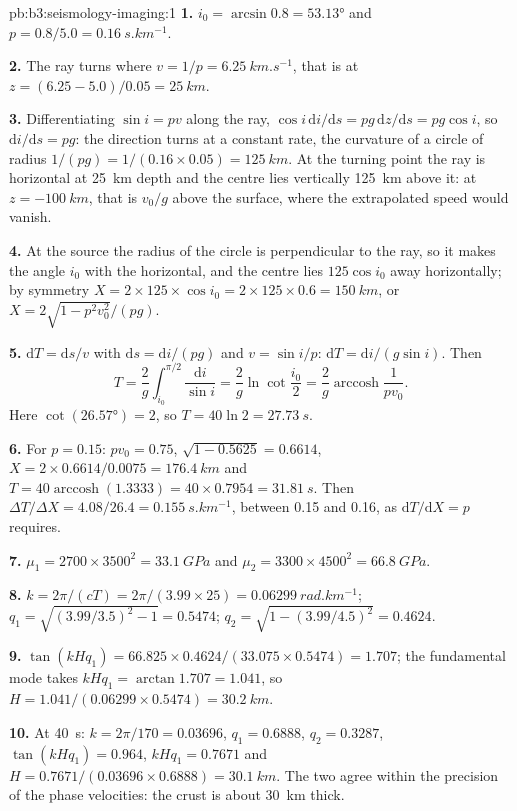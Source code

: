 \begin{solution}{pb:b3:seismology-imaging:1}
\textbf{1.} $i_0 = \arcsin 0.8 = \ang{53.13}$ and $p = 0.8/5.0 =
\qty{0.16}{s.km^{-1}}$.

\textbf{2.} The ray turns where $v = 1/p = \qty{6.25}{km.s^{-1}}$, that is at
$z = (6.25 - 5.0)/0.05 = \qty{25}{km}$.

\textbf{3.} Differentiating $\sin i = pv$ along the ray, $\cos i\,\mathrm di/
\mathrm ds = pg\,\mathrm dz/\mathrm ds = pg\cos i$, so $\mathrm di/\mathrm ds =
pg$: the direction turns at a constant rate, the curvature of a circle of radius
$1/(pg) = 1/(0.16\times0.05) = \qty{125}{km}$. At the turning point the ray is
horizontal at \qty{25}{km} depth and the centre lies vertically \qty{125}{km}
above it: at $z = \qty{-100}{km}$, that is $v_0/g$ above the surface, where the
extrapolated speed would vanish.

\textbf{4.} At the source the radius of the circle is perpendicular to the ray,
so it makes the angle $i_0$ with the horizontal, and the centre lies
$125\cos i_0$ away horizontally; by symmetry
$X = 2\times125\times\cos i_0 = 2\times125\times0.6 = \qty{150}{km}$, or
$X = 2\sqrt{1 - p^2v_0^2}/(pg)$.

\textbf{5.} $\mathrm dT = \mathrm ds/v$ with $\mathrm ds = \mathrm di/(pg)$ and
$v = \sin i/p$: $\mathrm dT = \mathrm di/(g\sin i)$. Then
\[
  T = \frac2g\int_{i_0}^{\pi/2}\frac{\mathrm di}{\sin i} = \frac2g\ln\cot\frac{i_0}2 =
  \frac2g\operatorname{arccosh}\frac1{pv_0} .
\]
Here $\cot(\ang{26.57}) = 2$, so
$T = 40\ln2 = \qty{27.73}{s}$.

\textbf{6.} For $p = 0.15$: $pv_0 = 0.75$, $\sqrt{1 - 0.5625} = 0.6614$,
$X = 2\times0.6614/0.0075 = \qty{176.4}{km}$ and $T = 40\operatorname{arccosh}
(1.3333) = 40\times0.7954 = \qty{31.81}{s}$. Then $\Delta T/\Delta X =
4.08/26.4 = \qty{0.155}{s.km^{-1}}$, between 0.15 and 0.16, as
$\mathrm dT/\mathrm dX = p$ requires.

\textbf{7.} $\mu_1 = 2700\times3500^2 = \qty{33.1}{GPa}$ and
$\mu_2 = 3300\times4500^2 = \qty{66.8}{GPa}$.

\textbf{8.} $k = 2\pi/(cT) = 2\pi/(3.99\times25) = \qty{0.06299}{rad.km^{-1}}$;
$q_1 = \sqrt{(3.99/3.5)^2 - 1} = 0.5474$; $q_2 = \sqrt{1 - (3.99/4.5)^2} = 0.4624$.

\textbf{9.} $\tan(kHq_1) = 66.825\times0.4624/(33.075\times0.5474) = 1.707$; the
fundamental mode takes $kHq_1 = \arctan1.707 = 1.041$, so
$H = 1.041/(0.06299\times0.5474) = \qty{30.2}{km}$.

\textbf{10.} At \qty{40}{s}: $k = 2\pi/170 = 0.03696$, $q_1 = 0.6888$,
$q_2 = 0.3287$, $\tan(kHq_1) = 0.964$, $kHq_1 = 0.7671$ and
$H = 0.7671/(0.03696\times0.6888) = \qty{30.1}{km}$. The two agree within the
precision of the phase velocities: the crust is about \qty{30}{km} thick.


\end{solution}
